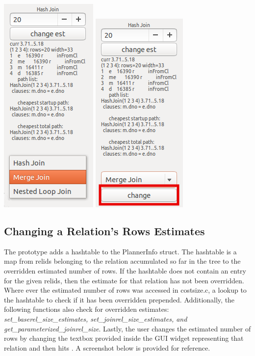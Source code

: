 \documentclass[letterpaper,10pt]{article}
\begin{document}
\begin{center}
\includegraphics[scale=0.7]{join-ddl.png}
\includegraphics[scale=0.7]{join-ddl-selected.png}
\end{center}

\subsection{Changing a Relation's Rows Estimates}
The prototype adds a hashtable to the PlannerInfo struct. The hashtable is a map
from relids belonging to the relation accumulated so far in the tree to the
overridden estimated number of rows. If the hashtable does not contain an entry
for the given relids, then the estimate for that relation has not been overridden.
Where ever the estimated number of rows was accessed in costsize.c, a lookup to
the hashtable to check if it has been overridden prepended. Additionally, the
following functions also check for overridden estimates:
\textit{set\_baserel\_size\_estimates, set\_joinrel\_size\_estimates, and
get\_parameterized\_joinrel\_size}. Lastly, the user changes the estimated number of
rows by changing the textbox provided inside the GUI widget representing that
relation and then hits . A screenshot below is provided for reference.
\end{document}
